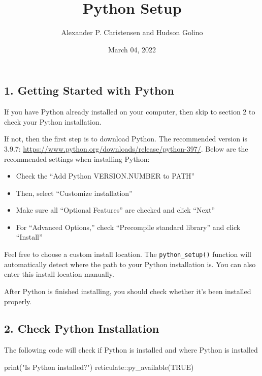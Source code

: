 \documentclass[
]{article}
\title{Python Setup}
\author{Alexander P. Christensen and Hudson Golino}
\date{March 04, 2022}
\newenvironment{Shaded}{\begin{snugshade}}{\end{snugshade}}
\newcommand{\ConstantTok}[1]{\textcolor[rgb]{0.00,0.00,0.00}{#1}}
\newcommand{\FunctionTok}[1]{\textcolor[rgb]{0.00,0.00,0.00}{#1}}
\newcommand{\NormalTok}[1]{#1}
\newcommand{\SpecialCharTok}[1]{\textcolor[rgb]{0.00,0.00,0.00}{#1}}
\newcommand{\StringTok}[1]{\textcolor[rgb]{0.31,0.60,0.02}{#1}}
\begin{document}
\maketitle

\hypertarget{section_1}{%
\subsection{1. Getting Started with Python}\label{section_1}}

If you have Python already installed on your computer, then skip to
section 2 to check your Python installation.

If not, then the first step is to download Python. The recommended
version is 3.9.7:
\url{https://www.python.org/downloads/release/python-397/}. Below are
the recommended settings when installing Python:

\begin{itemize}
\item
  Check the ``Add Python VERSION.NUMBER to PATH''
\item
  Then, select ``Customize installation''
\item
  Make sure all ``Optional Features'' are checked and click ``Next''
\item
  For ``Advanced Options,'' check ``Precompile standard library'' and
  click ``Install''
\end{itemize}

Feel free to choose a custom install location. The
\texttt{python\_setup()} function will automatically detect where the
path to your Python installation is. You can also enter this install
location manually.

After Python is finished installing, you should check whether it's been
installed properly.

\hypertarget{check-python-installation}{%
\subsection{2. Check Python
Installation}\label{check-python-installation}}

The following code will check if Python is installed and where Python is
installed

\begin{Shaded}
\begin{Highlighting}[]
\FunctionTok{print}\NormalTok{(}\StringTok{"Is Python installed?"}\NormalTok{)}
\NormalTok{reticulate}\SpecialCharTok{::}\FunctionTok{py\_available}\NormalTok{(}\ConstantTok{TRUE}\NormalTok{)}
\end{Highlighting}
\end{Shaded}
\end{document}
